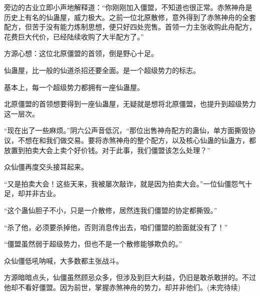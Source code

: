 \begin{this_body}
旁边的古业立即小声地解释道：“你刚刚加入僵盟，不知道也很正常。赤煞神舟是历史上有名的仙蛊屋，威力极大。之前一位北原散修，意外得到了赤煞神舟的全套配方，但苦于没有能力炼制思想，便只好四处兜售。首领一力主张收购此舟配方，花费巨大代价，已经陆续收购了大半配方了。”

方源心想：这位北原僵盟的首领，倒是野心十足。

仙蛊屋，比一般的仙道杀招还要全面。是一个超级势力的标志。

基本上，每一个超级势力都拥有一座仙蛊屋。

北原僵盟的首领想要得到一座仙蛊屋，无疑就是想将北原僵盟，也提升到超级势力这一层次。

“现在出了一些麻烦。”阴六公声音低沉，“那位出售神舟配方的蛊仙，单方面撕毁协议，不想在和我们做交易。要将赤煞神舟的整个配方，以及核心仙蛊的仙蛊方，都放置到拍卖大会上卖个好价钱。对于此事，我们僵盟该怎么处理？”

众仙僵再度交头接耳起来。

“又是拍卖大会！这些天来，我被屡次敲诈，就是因为拍卖大会。”一位仙僵怨气十足，却并非古业。

“这个蛊仙胆子不小，只是一介散修，居然连我们僵盟的协定都撕毁。”

“杀了他，必须要杀掉他，否则消息传出去，咱们僵盟的脸面就没有了！”

“僵盟虽然弱于超级势力，但也不是一个散修能够欺负的。”

众仙僵低吼呐喊，大多数都主张战斗。

方源暗暗点头，仙僵虽然顾忌众多，但涉及到巨大利益，仍旧是敢杀敢拼的。不过他却不看好僵盟。因为前世，掌握赤煞神舟的势力，却并非他们。(未完待续)

\end{this_body}


